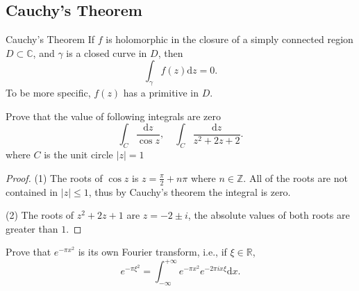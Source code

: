 \subsection{Cauchy's Theorem}

\begin{theorem}{Cauchy's Theorem}{}
  If $f$ is holomorphic in the closure of a simply connected region $D \subset \mathbb{C}$,
  and $\gamma$ is a closed curve in $D$, then
  \begin{equation}
    \int_{\gamma} f(z)\mathrm{d} z = 0.
  \end{equation}
  To be more specific, $f(z)$ has a primitive in $D$.
\end{theorem}

\begin{example}{}{}
  Prove that the value of following integrals are zero
  \begin{equation}
    \int_C \frac{\mathrm{d} z}{\cos z}, \quad
    \int_C \frac{\mathrm{d} z}{z^2 + 2z + 2}.
  \end{equation}
  where $C$ is the unit circle $|z| = 1$
\end{example}

\begin{proof}
  (1) The roots of $\cos z$ is $z = \frac{\pi}{2} + n\pi$ where $n \in \mathbb{Z}$.
  All of the roots are not contained in $|z| \leq 1$, thus by Cauchy's theorem the integral is zero.

  (2) The roots of $z^2 + 2z + 1$ are $z = -2 \pm i$, the absolute values of both roots are greater than $1$.
\end{proof}

\begin{example}{}{}
  Prove that $e^{-\pi x^2}$ is its own Fourier transform, i.e., if $\xi \in \mathbb{R}$,
  \begin{equation}
    e^{- \pi \xi^2} = \int_{-\infty}^{+\infty} e^{-\pi x^2} e^{-2\pi i x \xi} \mathrm{d} x.
  \end{equation}
\end{example}

